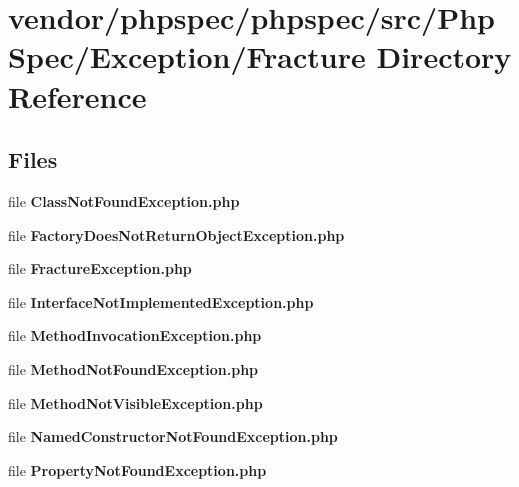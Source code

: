 \section{vendor/phpspec/phpspec/src/\+Php\+Spec/\+Exception/\+Fracture Directory Reference}
\label{dir_3e8db80d2b6322f99acf3720b5141d23}
\subsection*{Files}
\begin{DoxyCompactItemize}
\item 
file {\bf Class\+Not\+Found\+Exception.\+php}
\item 
file {\bf Factory\+Does\+Not\+Return\+Object\+Exception.\+php}
\item 
file {\bf Fracture\+Exception.\+php}
\item 
file {\bf Interface\+Not\+Implemented\+Exception.\+php}
\item 
file {\bf Method\+Invocation\+Exception.\+php}
\item 
file {\bf Method\+Not\+Found\+Exception.\+php}
\item 
file {\bf Method\+Not\+Visible\+Exception.\+php}
\item 
file {\bf Named\+Constructor\+Not\+Found\+Exception.\+php}
\item 
file {\bf Property\+Not\+Found\+Exception.\+php}
\end{DoxyCompactItemize}
